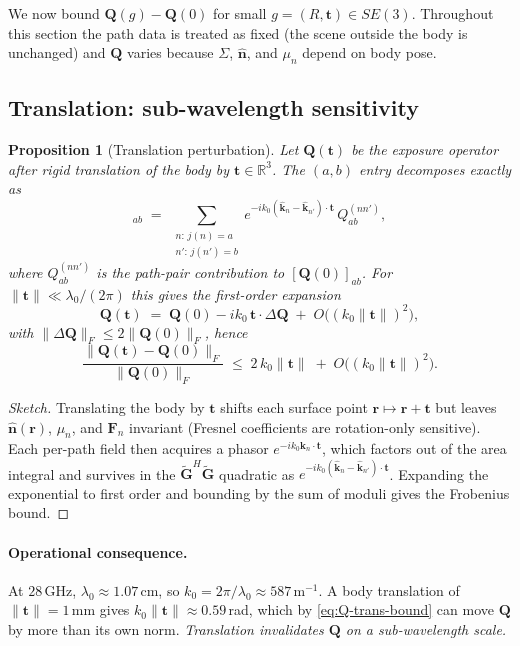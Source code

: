 \documentclass[11pt,a4paper]{article}
\newtheorem{proposition}[theorem]{Proposition}
\theoremstyle{definition}
\newcommand{\rr}{\mathbf{r}}
\newcommand{\nh}{\hat{\mathbf{n}}}
\newcommand{\kh}{\hat{\mathbf{k}}}
\newcommand{\Q}{\mathbf{Q}}
\newcommand{\Gt}{\tilde{\mathbf{G}}}
\newcommand{\F}{\mathbf{F}}
\newcommand{\Sigmaset}{\Sigma}
\newcommand{\R}{\mathbb{R}}
\begin{document}
We now bound $\Q(g) - \Q(0)$ for small $g=(R,\mathbf{t})\in SE(3)$.
Throughout this section the path data is treated as fixed (the scene
outside the body is unchanged) and $\Q$ varies because $\Sigmaset$,
$\nh$, and $\mu_n$ depend on body pose.

\subsection{Translation: sub-wavelength sensitivity}

\begin{proposition}[Translation perturbation]
\label{prop:translation}
Let $\Q(\mathbf{t})$ be the exposure operator after rigid translation of
the body by $\mathbf{t}\in\R^3$. The $(a,b)$ entry decomposes
exactly as
\begin{equation}
  [\Q(\mathbf{t})]_{ab} \;=\;
  \sum_{\substack{n:\,j(n)=a\\ n':\,j(n')=b}}
  e^{-ik_0(\kh_n - \kh_{n'})\cdot\mathbf{t}}\,
  Q_{ab}^{(nn')},
  \label{eq:Q-trans}
\end{equation}
where $Q_{ab}^{(nn')}$ is the path-pair contribution to $[\Q(0)]_{ab}$.
For $\|\mathbf{t}\|\ll \lambda_0/(2\pi)$ this gives the first-order
expansion
\begin{equation}
  \Q(\mathbf{t}) \;=\; \Q(0) - i k_0\,\mathbf{t}\cdot\Delta\Q \;+\; O\bigl((k_0\|\mathbf{t}\|)^2\bigr),
\end{equation}
with $\|\Delta\Q\|_F \le 2\|\Q(0)\|_F$, hence
\begin{equation}
  \frac{\|\Q(\mathbf{t})-\Q(0)\|_F}{\|\Q(0)\|_F}
  \;\le\; 2\,k_0\|\mathbf{t}\| \;+\; O\bigl((k_0\|\mathbf{t}\|)^2\bigr).
  \label{eq:Q-trans-bound}
\end{equation}
\end{proposition}

\begin{proof}[Sketch]
Translating the body by $\mathbf{t}$ shifts each surface point
$\rr\mapsto \rr+\mathbf{t}$ but leaves $\nh(\rr)$, $\mu_n$, and $\F_n$
invariant (Fresnel coefficients are rotation-only sensitive). Each
per-path field then acquires a phasor $e^{-ik_0\kh_n\cdot\mathbf{t}}$,
which factors out of the area integral and survives in the $\Gt^H\Gt$
quadratic as $e^{-ik_0(\kh_n-\kh_{n'})\cdot\mathbf{t}}$. Expanding the
exponential to first order and bounding by the sum of moduli gives the
Frobenius bound.
\end{proof}

\paragraph{Operational consequence.} At $28\,$GHz, $\lambda_0\!\approx\!1.07\,$cm,
so $k_0=2\pi/\lambda_0 \approx 587\,\mathrm{m}^{-1}$. A body translation
of $\|\mathbf{t}\|=1\,$mm gives $k_0\|\mathbf{t}\|\approx 0.59\,$rad,
which by \eqref{eq:Q-trans-bound} can move $\Q$ by more than its own
norm. \emph{Translation invalidates $\Q$ on a sub-wavelength scale.}
\end{document}
